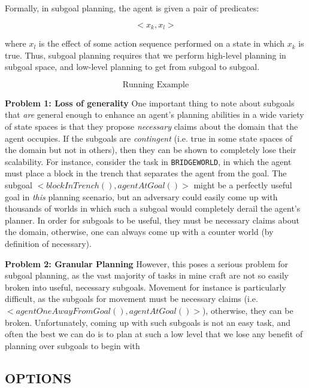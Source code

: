 \documentclass[]{article}
\begin{document}
Formally, in subgoal planning, the agent is given a pair of predicates:

\[ 
<x_k, x_l >
\]

where $x_l$ is the effect of some action sequence performed on a state in which $x_k$ is true. Thus, subgoal planning requires that we perform high-level planning in subgoal space, and low-level planning to get from subgoal to subgoal.

\[
\boxed{\text{Running Example}}
\]


{\bf Problem 1: Loss of generality}  One important thing to note about subgoals that {\it are} general enough to enhance an agent's planning abilities in a wide variety of state spaces is that they propose {\it necessary} claims about the domain that the agent occupies. If the subgoals are {\it contingent} (i.e. true in some state spaces of the domain but not in others), then they can be shown to completely lose their scalability. For instance, consider the task in \texttt{BRIDGEWORLD}, in which the agent must place a block in the trench that separates the agent from the goal. The subgoal $<blockInTrench(), agentAtGoal()>$ might be a perfectly useful goal in {\it this} planning scenario, but an adversary could easily come up with thousands of worlds in which such a subgoal would completely derail the agent's planner. In order for subgoals to be useful, they must be necessary claims about the domain, otherwise, one can always come up with a counter world (by definition of necessary). 

{\bf Problem 2: Granular Planning} However, this poses a serious problem for subgoal planning, as the vast majority of tasks in mine craft are not so easily broken into useful, necessary subgoals. Movement for instance is particularly difficult, as the subgoals for movement must be necessary claims (i.e. $<agentOneAwayFromGoal(), agentAtGoal()>$), otherwise, they can be broken. Unfortunately, coming up with such subgoals is not an easy task, and often the best we can do is to plan at such a low level that we lose any benefit of planning over subgoals to begin with



\subsection{OPTIONS}
\end{document}
